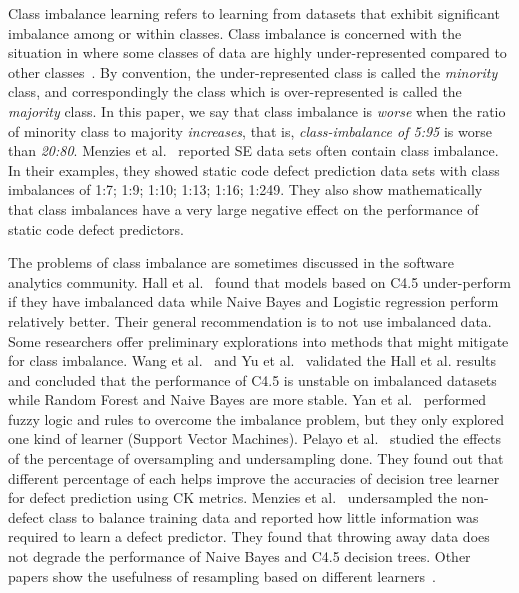 \documentclass[sigconf,review, anonymous]{acmart}
\theoremstyle{break}
\theoremstyle{break}
\begin{document}
Class imbalance learning refers to learning from datasets that exhibit significant imbalance among or within classes. Class imbalance  is concerned with the situation in where some classes of data are
highly under-represented compared to other classes~\cite{he2009learning}.
By convention,
the under-represented class is called the {\em minority} class,
and correspondingly the class which is over-represented is called the
{\em majority} class. In this paper, we say that class imbalance is {\em worse}
when the ratio of minority class to majority {\em increases}, that is,
{\em class-imbalance of 5:95} is worse than {\em 20:80}. Menzies et al.~\cite{menzies2007problems} reported SE data sets often contain class imbalance. In their examples, they showed static code defect prediction data sets with
class imbalances of 1:7; 1:9; 1:10; 1:13; 1:16; 1:249.
They also show mathematically that  class imbalances  have a very large  negative effect on the performance of static code defect predictors.  

The problems of class imbalance are sometimes discussed in the software analytics community.
Hall et al.~\cite{hall2012systematic} found that models based on C4.5 under-perform if they have imbalanced data while Naive Bayes and Logistic regression perform relatively better. 
Their general recommendation is to not use
imbalanced data.  
Some researchers offer preliminary explorations into methods that might mitigate for class imbalance.
Wang et al.~\cite{wang2013using} and Yu et al.~\cite{yuperformance} validated the Hall et al. results and concluded that the
performance of C4.5 is unstable on imbalanced datasets while  Random Forest and Naive Bayes are 
more stable. 
Yan et al.~\cite{yan2010software} performed fuzzy logic and rules to overcome the imbalance problem, but they only
explored one kind of learner (Support Vector Machines).
Pelayo et al.~\cite{pelayo2007applying} studied the effects of the percentage of oversampling and undersampling done. They found out that different percentage of each helps improve the accuracies of decision tree learner for defect prediction using CK metrics. Menzies et al.~\cite{menzies2008implications} undersampled the non-defect class to balance training
data and reported how little information was required to learn a defect predictor. They found that throwing away data does not degrade the performance of Naive Bayes and C4.5 decision trees. Other papers show the usefulness of resampling based on different learners~\cite{pelayo2007applying, pelayo2012evaluating, riquelme2008finding}.
\end{document}
